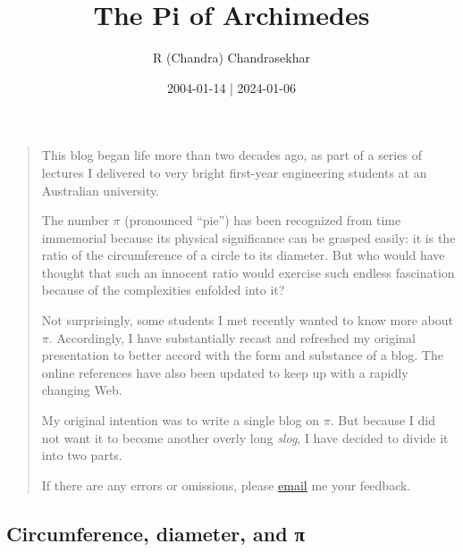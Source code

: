 \documentclass[
  a4paper,
]{article}
\title{The Pi of Archimedes}
\author{R (Chandra) Chandrasekhar}
\date{2004-01-14 | 2024-01-06}
\begin{document}
\maketitle

\thispagestyle{empty}


\begin{quote}
This blog began life more than two decades ago, as part of a series of
lectures I delivered to very bright first-year engineering students at
an Australian university.

The number \(\pi\) (pronounced ``pie'') has been recognized from time
immemorial because its physical significance can be grasped easily: it
is the ratio of the circumference of a circle to its diameter. But who
would have thought that such an innocent ratio would exercise such
endless fascination because of the complexities enfolded into it?

Not surprisingly, some students I met recently wanted to know more about
\(\pi\). Accordingly, I have substantially recast and refreshed my
original presentation to better accord with the form and substance of a
blog. The online references have also been updated to keep up with a
rapidly changing Web.

My original intention was to write a single blog on \(\pi\). But because
I did not want it to become another overly long \emph{slog}, I have
decided to divide it into two parts.

If there are any errors or omissions, please
\href{mailto:feedback.swanlotus@gmail.com}{email} me your feedback.
\end{quote}

\subsection{Circumference, diameter, and
π}\label{circumference-diameter-and-ux3c0}
\end{document}
